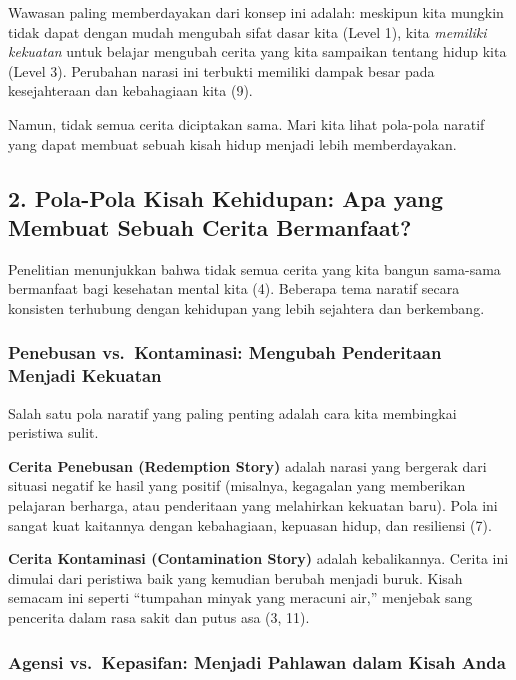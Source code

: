 \documentclass[
  letterpaper,
  DIV=11,
  numbers=noendperiod]{scrreprt}
\begin{document}
Wawasan paling memberdayakan dari konsep ini adalah: meskipun kita
mungkin tidak dapat dengan mudah mengubah sifat dasar kita (Level 1),
kita \emph{memiliki kekuatan} untuk belajar mengubah cerita yang kita
sampaikan tentang hidup kita (Level 3). Perubahan narasi ini terbukti
memiliki dampak besar pada kesejahteraan dan kebahagiaan kita (9).

Namun, tidak semua cerita diciptakan sama. Mari kita lihat pola-pola
naratif yang dapat membuat sebuah kisah hidup menjadi lebih
memberdayakan.

\subsection{\texorpdfstring{\textbf{2. Pola-Pola Kisah Kehidupan: Apa
yang Membuat Sebuah Cerita
Bermanfaat?}}{2. Pola-Pola Kisah Kehidupan: Apa yang Membuat Sebuah Cerita Bermanfaat?}}\label{pola-pola-kisah-kehidupan-apa-yang-membuat-sebuah-cerita-bermanfaat}

Penelitian menunjukkan bahwa tidak semua cerita yang kita bangun
sama-sama bermanfaat bagi kesehatan mental kita (4). Beberapa tema
naratif secara konsisten terhubung dengan kehidupan yang lebih sejahtera
dan berkembang.

\subsubsection{Penebusan vs.~Kontaminasi: Mengubah Penderitaan Menjadi
Kekuatan}\label{penebusan-vs.-kontaminasi-mengubah-penderitaan-menjadi-kekuatan}

Salah satu pola naratif yang paling penting adalah cara kita membingkai
peristiwa sulit.

\textbf{Cerita Penebusan (Redemption Story)} adalah narasi yang bergerak
dari situasi negatif ke hasil yang positif (misalnya, kegagalan yang
memberikan pelajaran berharga, atau penderitaan yang melahirkan kekuatan
baru). Pola ini sangat kuat kaitannya dengan kebahagiaan, kepuasan
hidup, dan resiliensi (7).

\textbf{Cerita Kontaminasi (Contamination Story)} adalah kebalikannya.
Cerita ini dimulai dari peristiwa baik yang kemudian berubah menjadi
buruk. Kisah semacam ini seperti ``tumpahan minyak yang meracuni air,''
menjebak sang pencerita dalam rasa sakit dan putus asa (3, 11).

\subsubsection{Agensi vs.~Kepasifan: Menjadi Pahlawan dalam Kisah
Anda}\label{agensi-vs.-kepasifan-menjadi-pahlawan-dalam-kisah-anda}
\end{document}
